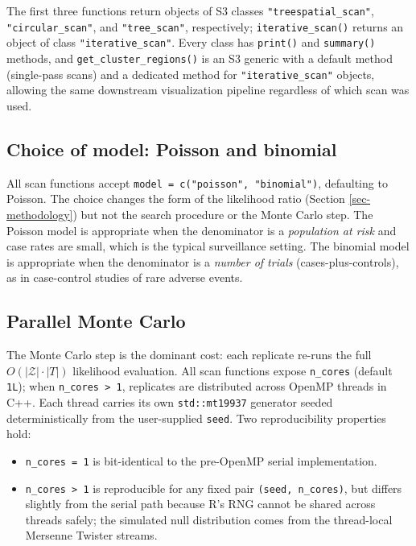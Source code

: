 The first three functions return objects of S3 classes
\texttt{"treespatial\_scan"}, \texttt{"circular\_scan"}, and \texttt{"tree\_scan"}, respectively;
\texttt{iterative\_scan()} returns an object of class \texttt{"iterative\_scan"}. Every
class has \texttt{print()} and \texttt{summary()} methods, and \texttt{get\_cluster\_regions()} is
an S3 generic with a default method (single-pass scans) and a dedicated
method for \texttt{"iterative\_scan"} objects, allowing the same downstream
visualization pipeline regardless of which scan was used.

\hypertarget{choice-of-model-poisson-and-binomial}{%
\subsection{Choice of model: Poisson and binomial}\label{choice-of-model-poisson-and-binomial}}

All scan functions accept \texttt{model\ =\ c("poisson",\ "binomial")}, defaulting
to Poisson. The choice changes the form of the likelihood ratio
(Section \ref{sec-methodology}) but not the search procedure or the
Monte Carlo step. The Poisson model is appropriate when the denominator
is a \emph{population at risk} and case rates are small, which is the typical
surveillance setting. The binomial model is appropriate when the
denominator is a \emph{number of trials} (cases-plus-controls), as in
case-control studies of rare adverse events.

\hypertarget{parallel-monte-carlo}{%
\subsection{Parallel Monte Carlo}\label{parallel-monte-carlo}}

The Monte Carlo step is the dominant cost: each replicate re-runs the full
\(O(|\mathcal{Z}| \cdot |T|)\) likelihood evaluation. All scan functions
expose \texttt{n\_cores} (default \texttt{1L}); when \texttt{n\_cores\ \textgreater{}\ 1}, replicates are
distributed across OpenMP threads in C++. Each thread carries its own
\texttt{std::mt19937} generator seeded deterministically from the user-supplied
\texttt{seed}. Two reproducibility properties hold:

\begin{itemize}
\tightlist
\item
  \texttt{n\_cores\ =\ 1} is bit-identical to the pre-OpenMP serial implementation.
\item
  \texttt{n\_cores\ \textgreater{}\ 1} is reproducible for any fixed pair \texttt{(seed,\ n\_cores)},
  but differs slightly from the serial path because R's RNG cannot be
  shared across threads safely; the simulated null distribution comes from
  the thread-local Mersenne Twister streams.
\end{itemize}

